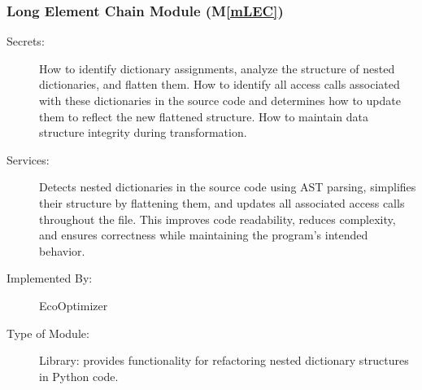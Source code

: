 \documentclass[12pt, titlepage]{article}
\newcommand{\mref}[1]{M\ref{#1}}
\begin{document}
\subsubsection{Long Element Chain Module (\mref{mLEC})}

\begin{description}
    \item[Secrets:] How to identify dictionary assignments, analyze the structure of nested dictionaries, and flatten them. How to identify all access calls associated with these dictionaries in the source code and determines how to update them to reflect the new flattened structure. How to maintain data structure integrity during transformation.
    \item[Services:] Detects nested dictionaries in the source code using AST parsing, simplifies their 
    structure by flattening them, and updates all associated access calls throughout the file. This improves 
    code readability, reduces complexity, and ensures correctness while maintaining the program's intended behavior.
    \item[Implemented By:] EcoOptimizer
    \item[Type of Module:] Library: provides functionality for refactoring nested dictionary structures in Python code.
\end{description}
\end{document}
